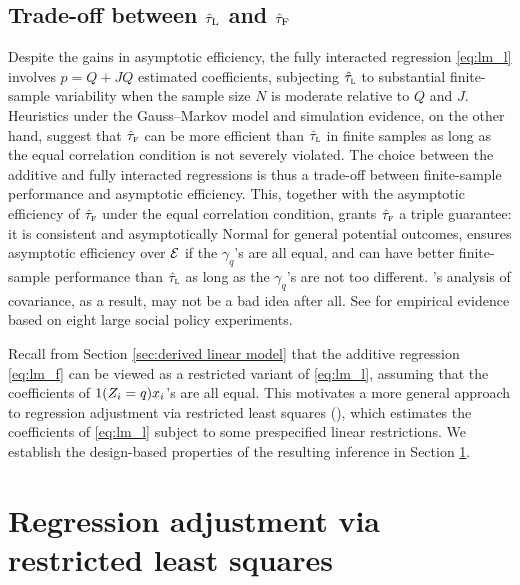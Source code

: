 \documentclass[11pt]{article}
\theoremstyle{definition}
\begin{document}
 
 
 
\subsection{Trade-off between $\hat\tau_\textup{L}$ and $\hat\tau_\textup{F}$}

Despite the gains in asymptotic efficiency, the fully interacted regression \eqref{eq:lm_l} involves $p = Q + JQ$ estimated coefficients, subjecting $\hat\tau_{\textsc{l}}$ to substantial finite-sample variability when the sample size $N$ is moderate relative to $Q$ and $J$.
Heuristics under the Gauss--Markov model and simulation evidence, on the other hand, suggest that $\hat\tau_{\textsc{f}}$ can be more efficient than $\hat\tau_{\textsc{l}}$ in finite samples as long as the equal correlation condition is not severely violated.
The choice between the additive and fully interacted regressions is thus a trade-off between finite-sample performance and asymptotic efficiency.
%
This, together with the asymptotic efficiency of $\hat\tau_{\textsc{f}}$ under the equal correlation condition, grants $\hat\tau_{\textsc{f}}$ a triple guarantee: it is consistent and asymptotically Normal for general potential outcomes, ensures asymptotic efficiency over $\mathcal{E}$ if the $\gamma_q$'s are all equal, and can have better finite-sample performance than $\hat\tau_{\textsc{l}}$ as long as the $\gamma_q$'s are not too different. \citet{Fisher35}'s analysis of covariance, as a result, may not be a bad idea after all. See \cite{Schochet10} for empirical evidence based on eight large social policy experiments.

 
Recall from Section \ref{sec:derived linear model} that the additive regression \eqref{eq:lm_f} can be viewed as a restricted variant of \eqref{eq:lm_l}, assuming that the coefficients of $1(Z_i=q) x_i$'s are all equal. 
This motivates a more general approach to regression adjustment via restricted least squares (\rls),
which estimates the coefficients of \eqref{eq:lm_l} subject to some prespecified linear restrictions.
We establish the design-based properties of the resulting inference in Section \ref{sec:rls}. 
 
%
%

%
\section{Regression adjustment via restricted least squares}\label{sec:rls}
%
\end{document}

